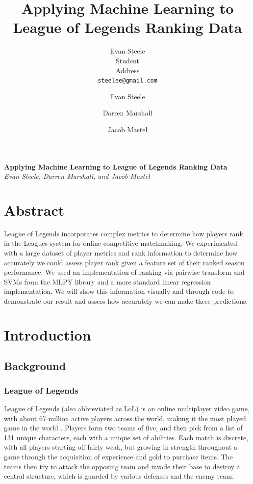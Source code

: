 \documentclass{article} %
\author{
Evan Steele \\
Student \\
Address \\
\texttt{steelee@gmail.com} \\
}
\title{Applying Machine Learning to League of Legends Ranking Data}
\author{Evan Steele \and Darren Marshall \and Jacob Mastel}
\begin{document}
\begin{titlepage}
   \begin{center}
      \Large\textbf{Applying Machine Learning to League of Legends Ranking Data}\\
      \large\textit{Evan Steele, Darren Marshall, and Jacob Mastel}
   \end{center}
\end{titlepage}
\section{Abstract}
League of Legends incorporates complex metrics to determine how players rank in the Leagues system for online competitive matchmaking. We experimented with a large dataset of player metrics and rank information to determine how accurately we could assess player rank given a feature set of their ranked season performance. We used an implementation of ranking via pairwise transform and SVMs from the MLPY library and a more standard linear regression implementation. We will show this information visually and through code to demonstrate our result and assess how accurately we can make these predictions.


\section{Introduction}
\subsection{Background}
\subsubsection{League of Legends}
League of Legends (also abbreviated as LoL) is an online multiplayer video game, with about 67 million active players across the world, making it the most played game in the world \cite{statista}. Players form two teams of five, and then pick from a list of 131 unique characters, each with a unique set of abilities. Each match is discrete, with all players starting off fairly weak, but growing in strength throughout a game through the acquisition of experience and gold to purchase items. The teams then try to attack the opposing team and invade their base to destroy a central structure, which is guarded by various defenses and the enemy team.\\
\end{document}
